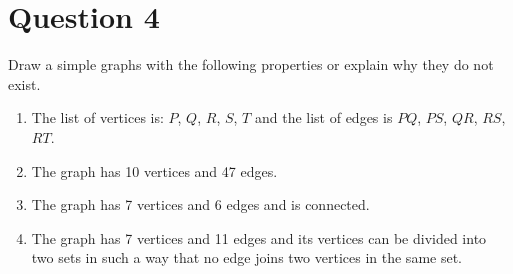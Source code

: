\documentclass[11pt]{article}
\begin{document}
\section*{Question 4}
Draw a simple graphs with the following properties or explain why they do not
exist.

\begin{enumerate}[label= (\alph*)]
  \item The list of vertices is: $P$, $Q$, $R$, $S$, $T$ and the list of edges
    is $PQ$, $PS$, $QR$, $RS$, $RT$.

  \item The graph has 10 vertices and 47 edges.

  \item The graph has 7 vertices and 6 edges and is connected.

  \item The graph has 7 vertices and 11 edges and its vertices can be divided
  into two sets in such a way that no edge joins two vertices in the same set.

\end{enumerate}
\end{document}
